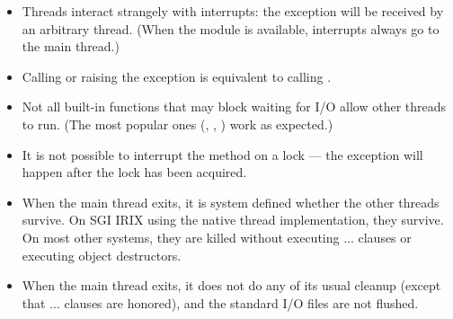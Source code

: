 \begin{itemize}
\item
Threads interact strangely with interrupts: the
 exception will be received by an
arbitrary thread.  (When the 
module is available, interrupts always go to the main thread.)

\item
Calling  or raising the 
exception is equivalent to calling .

\item
Not all built-in functions that may block waiting for I/O allow other
threads to run.  (The most popular ones (,
, ) work as
expected.)

\item
It is not possible to interrupt the  method on a lock
--- the  exception will happen after the
lock has been acquired.

\item
When the main thread exits, it is system defined whether the other
threads survive.  On SGI IRIX using the native thread implementation,
they survive.  On most other systems, they are killed without
executing  ...  clauses or executing
object destructors.

\item
When the main thread exits, it does not do any of its usual cleanup
(except that  ...  clauses are honored),
and the standard I/O files are not flushed.

\end{itemize}
